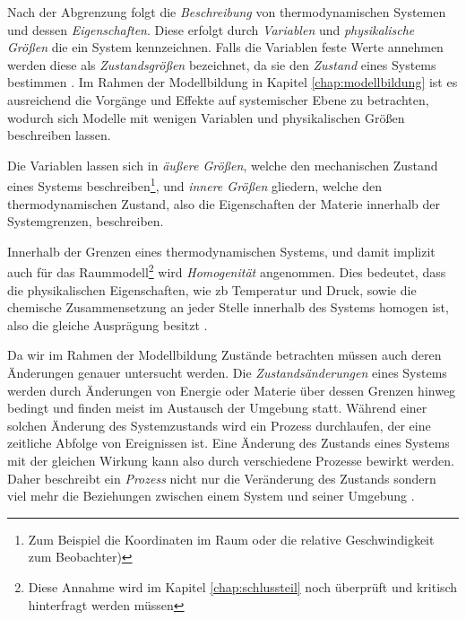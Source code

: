 Nach der Abgrenzung folgt die \textit{Beschreibung} von thermodynamischen Systemen und dessen \textit{Eigenschaften}. Diese erfolgt durch \textit{Variablen} und \textit{physikalische Größen} die ein System kennzeichnen. Falls die Variablen feste Werte annehmen werden diese als \textit{Zustandsgrößen} bezeichnet, da sie den \textit{Zustand} eines Systems bestimmen \cite[S.~13]{ba12}. Im Rahmen der Modellbildung in Kapitel \ref{chap:modellbildung} ist es ausreichend die Vorgänge und Effekte auf systemischer Ebene zu betrachten, wodurch sich Modelle mit wenigen Variablen und physikalischen Größen beschreiben lassen.

Die Variablen lassen sich in \textit{äußere Größen}, welche den mechanischen Zustand eines Systems beschreiben\footnote{Zum Beispiel die Koordinaten im Raum oder die relative Geschwindigkeit zum Beobachter)}, und \textit{innere Größen} gliedern, welche den thermodynamischen Zustand, also die Eigenschaften der Materie innerhalb der Systemgrenzen, beschreiben\cite[S.13~f.]{ba12}.

Innerhalb der Grenzen eines thermodynamischen Systems, und damit implizit auch für das Raummodell\footnote{Diese Annahme wird im Kapitel \ref{chap:schlussteil} noch überprüft und kritisch hinterfragt werden müssen} wird \textit{Homogenität} angenommen. Dies bedeutet, dass die physikalischen Eigenschaften, wie \acrlong{zb} Temperatur und Druck, sowie die chemische Zusammensetzung an jeder Stelle innerhalb des Systems homogen ist, also die gleiche Ausprägung besitzt \cite[S.15]{ba12}.

Da wir im Rahmen der Modellbildung Zustände betrachten müssen auch deren Änderungen genauer untersucht werden. Die \textit{Zustandsänderungen} eines Systems werden durch Änderungen von Energie oder Materie über dessen Grenzen hinweg bedingt und finden meist im Austausch der Umgebung statt. Während einer solchen Änderung des Systemzustands wird ein Prozess durchlaufen, der eine zeitliche Abfolge von Ereignissen ist. Eine Änderung des Zustands eines Systems mit der gleichen Wirkung kann also durch verschiedene Prozesse bewirkt werden. Daher beschreibt ein \textit{Prozess} nicht nur die Veränderung des Zustands sondern viel mehr die Beziehungen zwischen einem System und seiner Umgebung \cite[S.21~f.]{ba12}.

